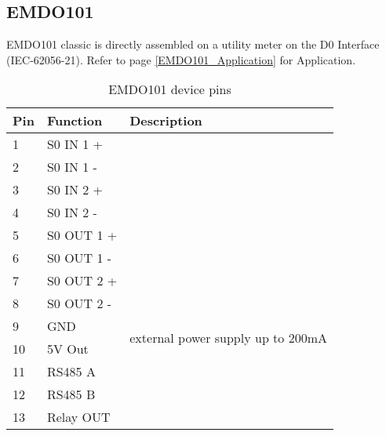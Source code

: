 \documentclass[11pt,fleqn]{book} %
\numberwithin{equation}{section} %
\numberwithin{figure}{section} %
\numberwithin{table}{section} %
\begin{document}



\subsection{EMDO101}
EMDO101 classic is directly assembled on a utility meter on the D0 Interface (IEC-62056-21). Refer to page \ref{EMDO101_Application} for Application.

\begin{table}[h!]
\caption{EMDO101 device pins}
\label{tbl:EMDO101_pins}
\begin{tabular}{@{}l l p{10cm} @{}}\\\hline
Pin & 	Function 		& Description		\\\hline
1 	&	S0 IN 1 +		& \multirow{4}{10cm}{}	\\
2 	&	S0 IN 1 -		& 					\\
3 	&	S0 IN 2 +		&  					\\
4 	&	S0 IN 2 -		& 					\\\hline
5 	&	S0 OUT 1 +		& \multirow{4}{10cm}{}	\\	
6 	&	S0 OUT 1 -		& 					\\
7 	&	S0 OUT 2 +		& 					\\
8 	&	S0 OUT 2 -		& 					\\\hline
9 	&	GND				& \multirow{2}{10cm}{external power supply up to 200mA} \\
10 	&	5V Out		 	& 					\\\hline
11 	&	RS485 A			& \multirow{2}{10cm}{}	\\
12 	&	RS485 B			&					\\\hline
13 	&	Relay OUT		& 				\\\hline
\end{tabular}
\end{table}
\end{document}
